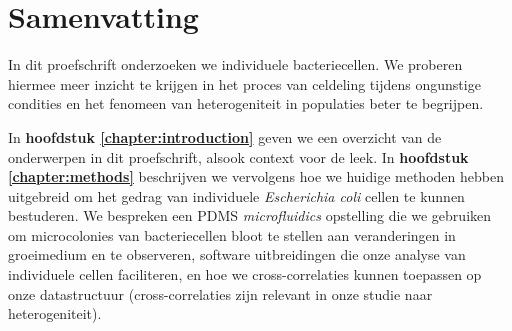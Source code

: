 
\chapter*{Samenvatting}



In dit proefschrift onderzoeken we individuele bacteriecellen.
We proberen hiermee meer inzicht te krijgen in het proces van celdeling tijdens ongunstige condities en
het fenomeen van heterogeniteit in populaties beter te begrijpen.


In \textbf{hoofdstuk \ref{chapter:introduction}} geven we een overzicht van de onderwerpen in dit proefschrift,
alsook context voor de leek.
%
In \textbf{hoofdstuk \ref{chapter:methods}} beschrijven we vervolgens hoe we huidige methoden hebben uitgebreid om het gedrag van 
individuele \textit{Escherichia coli} cellen te kunnen bestuderen.
%
We bespreken een PDMS \textit{microfluidics} opstelling die we gebruiken om microcolonies van bacteriecellen bloot te stellen aan veranderingen in groeimedium en te observeren, 
software uitbreidingen die onze analyse van individuele cellen faciliteren,
en hoe we cross-correlaties kunnen toepassen op onze datastructuur (cross-correlaties zijn relevant in onze studie naar heterogeniteit).

